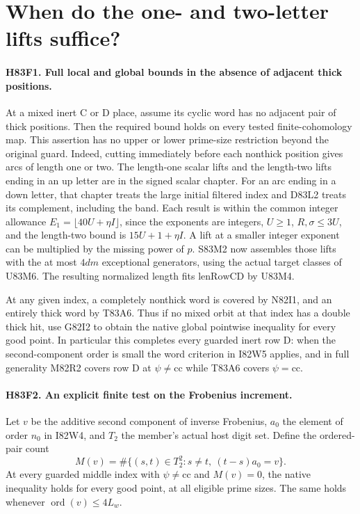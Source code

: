 \section{When do the one- and two-letter lifts suffice?}

\paragraph{H83F1. Full local and global bounds in the absence of adjacent thick positions.}
At a mixed inert C or D place, assume its cyclic word has no adjacent
pair of thick positions. Then the required bound holds on every
tested finite-cohomology map. This assertion has no upper or lower
prime-size restriction beyond the original guard. Indeed, cutting
immediately before each nonthick position gives arcs of length one
or two. The length-one scalar lifts and the length-two lifts ending
in an up letter are in the signed scalar chapter. For an arc ending
in a down letter, that chapter treats the large initial filtered
index and D83L2 treats its complement, including the band. Each
result is within the common integer allowance
$E_1=\lfloor40U+\eta I\rfloor$, since the exponents are integers,
$U\ge1$, $R,\sigma\le3U$, and the length-two bound is
$15U+1+\eta I$. A lift at a smaller integer exponent can be
multiplied by the missing power of $p$. S83M2 now assembles those
lifts with the at most $4dm$ exceptional generators, using the
actual target classes of U83M6. The resulting normalized length
fits $\mathrm{lenRowCD}$ by U83M4.

At any given index, a completely nonthick word is covered by
N82I1, and an entirely thick word by T83A6. Thus if no mixed
orbit at that index has a double thick hit, use G82I2 to obtain
the native global pointwise inequality for every good point. In
particular this completes every guarded inert row D: when the
second-component order is small the word criterion in I82W5
applies, and in full generality M82R2 covers row D at
$\psi\ne\mathrm{cc}$ while T83A6 covers $\psi=\mathrm{cc}$.

\paragraph{H83F2. An explicit finite test on the Frobenius increment.}
Let $v$ be the additive second component of inverse Frobenius,
$a_0$ the element of order $n_0$ in I82W4, and $T_2$ the
member's actual host digit set. Define the ordered-pair count
\[
   M(v)=\#\{(s,t)\in T_2^2:s\ne t,\ (t-s)a_0=v\}.
\]
At every guarded middle index with $\psi\ne\mathrm{cc}$ and
$M(v)=0$, the native inequality holds for every good point,
at all eligible prime sizes. The same holds whenever
$\operatorname{ord}(v)\le4 L_w$.

